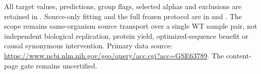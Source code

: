 All target values, predictions, group flags, selected alphas and exclusions are retained in . Source-only fitting and the full frozen protocol are in  and . The scope remains same-organism source transport over a single WT sample pair, not independent biological replication, protein yield, optimized-sequence benefit or causal synonymous intervention. Primary data source: \url{https://www.ncbi.nlm.nih.gov/geo/query/acc.cgi?acc=GSE63789}. The content-page gate remains uncertified.






